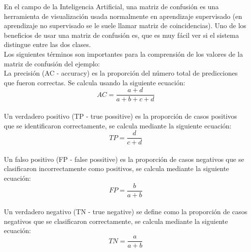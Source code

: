 			En el campo de la Inteligencia Artificial, una matriz de confusión es una herramienta de visualización usada normalmente en aprendizaje supervisado (en aprendizaje no supervisado se le suele llamar matriz de coincidencias). Uno de los beneficios de usar una matriz de confusión es, que es muy fácil ver si el sistema distingue entre las dos clases.\\
			
			Los siguientes términos son importantes para la comprensión de los valores de la matriz de confusión del ejemplo:\\

    		La precisión (AC - accuracy) es la proporción del número total de predicciones que fueron correctas. Se calcula usando la siguiente ecuación:\\

			\begin{equation}
				AC = \frac{a+d}{a+b+c+d}
				\label{AC}
			\end{equation}
			\\

		    Un verdadero positivo (TP - true possitive) es la proporción de casos positivos que se identificaron correctamente, se calcula mediante la siguiente ecuación:\\

			\begin{equation}
				TP = \frac{d}{c+d}
				\label{TP}
			\end{equation}
			\\

			Un falso positivo (FP - false possitive) es la proporción de casos negativos que se clasificaron incorrectamente como positivos, se calcula mediante la siguiente ecuación:\\

			\begin{equation}
				FP = \frac{b}{a+b}
				\label{FP}
			\end{equation}
			\\

			Un verdadero negativo (TN - true negative) se define como la proporción de casos negativos que se clasificaron correctamente, se calcula mediante la siguiente ecuación:\\

			\begin{equation}
				TN = \frac{a}{a+b}
				\label{TN}
			\end{equation}
			\\

